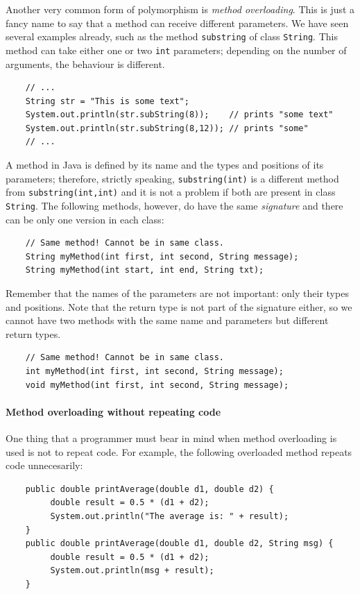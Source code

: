 Another very common form of polymorphism is \emph{method
  overloading}. This is just a fancy name to say that a method can
receive different parameters. We have seen several examples already,
such as the method \verb+substring+ of class \verb+String+. This
method can take either one or two \verb+int+ parameters; depending on
the number of arguments, the behaviour is different. 

\begin{verbatim}
    // ...
    String str = "This is some text";
    System.out.println(str.subString(8));    // prints "some text"
    System.out.println(str.subString(8,12)); // prints "some"
    // ...
\end{verbatim}

A method in Java is defined by its name and the types and positions of
its parameters; therefore, strictly speaking, \verb+substring(int)+ is
a different method from \verb+substring(int,int)+ and it is not a
problem if both are present in class \verb+String+. The following
methods, however, do have the same \emph{signature} and there can be
only one version in each class: 

\begin{verbatim}
    // Same method! Cannot be in same class.
    String myMethod(int first, int second, String message);
    String myMethod(int start, int end, String txt);
\end{verbatim}

Remember that the names of the parameters are not important: only their types and
positions. Note that the return type is not part of the signature
either, so we cannot have two methods with the same name and
parameters but different return types. 

\begin{verbatim}
    // Same method! Cannot be in same class.
    int myMethod(int first, int second, String message);
    void myMethod(int first, int second, String message);
\end{verbatim}

\paragraph{Method overloading without repeating code}
\label{sec:meth-overl-with}

One thing that a programmer must bear in mind when method overloading
is used is not to repeat code. For example, the following overloaded
method repeats code unnecesarily: 

\begin{verbatim}
    public double printAverage(double d1, double d2) {
         double result = 0.5 * (d1 + d2);
         System.out.println("The average is: " + result);
    }
    public double printAverage(double d1, double d2, String msg) {
         double result = 0.5 * (d1 + d2);
         System.out.println(msg + result);
    }
\end{verbatim}

